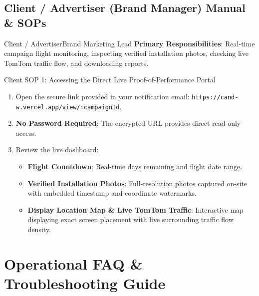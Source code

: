 \documentclass[11pt,a4paper]{article}
\begin{document}
\newpage

\subsection{Client / Advertiser (Brand Manager) Manual \& SOPs}

\begin{rolebox}{Client / Advertiser}{Brand Marketing Lead}
\textbf{Primary Responsibilities}: Real-time campaign flight monitoring, inspecting verified installation photos, checking live TomTom traffic flow, and downloading reports.
\end{rolebox}

\begin{sopbox}{Client SOP 1: Accessing the Direct Live Proof-of-Performance Portal}
\begin{enumerate}[leftmargin=1.2em, itemsep=2pt]
    \item Open the secure link provided in your notification email: \texttt{https://cand-w.vercel.app/view/:campaignId}.
    \item \textbf{No Password Required}: The encrypted URL provides direct read-only access.
    \item Review the live dashboard:
    \begin{itemize}[leftmargin=1em, itemsep=2pt]
        \item \textbf{Flight Countdown}: Real-time days remaining and flight date range.
        \item \textbf{Verified Installation Photos}: Full-resolution photos captured on-site with embedded timestamp and coordinate watermarks.
        \item \textbf{Display Location Map \& Live TomTom Traffic}: Interactive map displaying exact screen placement with live surrounding traffic flow density.
    \end{itemize}
\end{enumerate}
\end{sopbox}

\newpage

\section{Operational FAQ \& Troubleshooting Guide}
\end{document}
